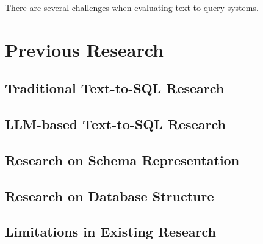 There are several challenges when evaluating text-to-query systems. 


\section{Previous Research}
    \subsection{Traditional Text-to-SQL Research}
    \subsection{LLM-based Text-to-SQL Research}
    \subsection{Research on Schema Representation}
    \subsection{Research on Database Structure}
    \subsection{Limitations in Existing Research}
